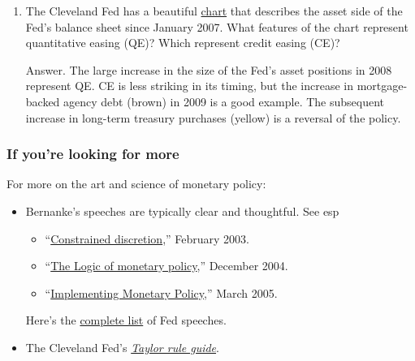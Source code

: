\documentclass[letterpaper,12pt]{article}
\begin{document}
\begin{enumerate}
\item The Cleveland Fed has a beautiful 
\href{http://www.clevelandfed.org/research/data/credit_easing/index.cfm}{chart}
that describes the asset side of the Fed's balance sheet since January 2007. 
What features of the chart represent quantitative easing (QE)?  
Which represent credit easing (CE)?  

Answer.  
The large increase in the size of the Fed's asset positions in 2008
represent QE.
CE is less striking in its timing, but the increase in mortgage-backed
agency debt (brown) in 2009 is a good example.  The subsequent 
increase in long-term treasury purchases (yellow) is a reversal 
of the policy.  

\end{enumerate}


\subsubsection*{If you're looking for more}

For more on the art and science of monetary policy:
%
\begin{itemize}
\item Bernanke's speeches are typically clear and thoughtful.
See esp
\begin{itemize}
\item
``\href{http://www.federalreserve.gov/boarddocs/speeches/2003/20030203/default.htm}
{Constrained discretion},'' February 2003.

\item ``\href{http://www.federalreserve.gov/boarddocs/Speeches/2004/20041202/default.htm}
{The Logic of monetary policy},'' December 2004.

\item
``\href{http://www.federalreserve.gov/BoardDocs/Speeches/2005/20050330/default.htm}
{Implementing Monetary Policy},''
March 2005.

\end{itemize}
Here's the
\href{http://www.federalreserve.gov/newsevents/speech/2010speech.htm}
{complete list} of Fed speeches.


\item The Cleveland Fed's
\href{http://www.clevelandfed.org/Research/Com2003/0703.pdf}
{\it Taylor rule guide\/}.
\end{itemize}
\end{document}
